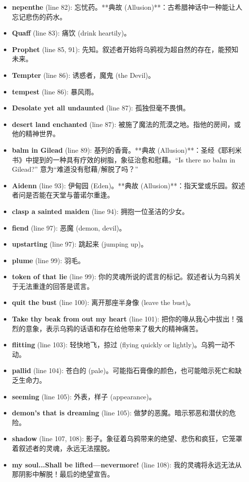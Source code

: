 \documentclass[12pt, a4paper]{article}
\begin{document}
\begin{itemize}
    \item \textbf{nepenthe} (line 82): 忘忧药。**典故 (Allusion)**：古希腊神话中一种能让人忘记悲伤的药水。
    \item \textbf{Quaff} (line 83): 痛饮 (drink heartily)。
    \item \textbf{Prophet} (line 85, 91): 先知。叙述者开始将乌鸦视为超自然的存在，能预知未来。
    \item \textbf{Tempter} (line 86): 诱惑者，魔鬼 (the Devil)。
    \item \textbf{tempest} (line 86): 暴风雨。
    \item \textbf{Desolate yet all undaunted} (line 87): 孤独但毫不畏惧。
    \item \textbf{desert land enchanted} (line 87): 被施了魔法的荒漠之地。指他的房间，或他的精神世界。
    \item \textbf{balm in Gilead} (line 89): 基列的香膏。**典故 (Allusion)**：圣经《耶利米书》中提到的一种具有疗效的树脂，象征治愈和慰藉。“Is there no balm in Gilead?” 意为“难道没有慰藉/解脱了吗？”
    \item \textbf{Aidenn} (line 93): 伊甸园 (Eden)。**典故 (Allusion)**：指天堂或乐园。叙述者问是否能在天堂与蕾诺尔重逢。
    \item \textbf{clasp a sainted maiden} (line 94): 拥抱一位圣洁的少女。
    \item \textbf{fiend} (line 97): 恶魔 (demon, devil)。
    \item \textbf{upstarting} (line 97): 跳起来 (jumping up)。
    \item \textbf{plume} (line 99): 羽毛。
    \item \textbf{token of that lie} (line 99): 你的灵魂所说的谎言的标记。叙述者认为乌鸦关于无法重逢的回答是谎言。
    \item \textbf{quit the bust} (line 100): 离开那座半身像 (leave the bust)。
    \item \textbf{Take thy beak from out my heart} (line 101): 把你的喙从我心中拔出！强烈的意象，表示乌鸦的话语和存在给他带来了极大的精神痛苦。
    \item \textbf{flitting} (line 103): 轻快地飞，掠过 (flying quickly or lightly)。乌鸦一动不动。
    \item \textbf{pallid} (line 104): 苍白的 (pale)。可能指石膏像的颜色，也可能暗示死亡和缺乏生命力。
    \item \textbf{seeming} (line 105): 外表，样子 (appearance)。
    \item \textbf{demon's that is dreaming} (line 105): 做梦的恶魔。暗示邪恶和潜伏的危险。
    \item \textbf{shadow} (line 107, 108): 影子。象征着乌鸦带来的绝望、悲伤和疯狂，它笼罩着叙述者的灵魂，永远无法摆脱。
    \item \textbf{my soul...Shall be lifted—nevermore!} (line 108): 我的灵魂将永远无法从那阴影中解脱！最后的绝望宣告。
\end{itemize}
\end{document}
